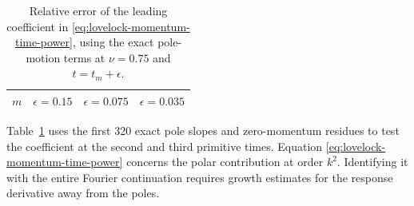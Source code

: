 \begin{table}[t]
 \centering\small
 \begin{tabular}{cccc}
 \hline
 \(m\) & \(\epsilon=0.15\) & \(\epsilon=0.075\) & \(\epsilon=0.035\) \\
 \hline
 
 \end{tabular}
 \caption{Relative error of the leading coefficient in
 \eqref{eq:lovelock-momentum-time-power}, using the exact
 pole-motion terms at \(\nu=0.75\) and \(t=t_m+\epsilon\).}
 \label{tab:lovelock-momentum-time}
\end{table}

Table~\ref{tab:lovelock-momentum-time} uses the first 320
exact pole slopes and zero-momentum residues to test the
coefficient at the second and third primitive times.
Equation \eqref{eq:lovelock-momentum-time-power} concerns the
polar contribution at order \(k^2\).
Identifying it with the entire Fourier continuation requires
growth estimates for the response derivative away from the poles.
